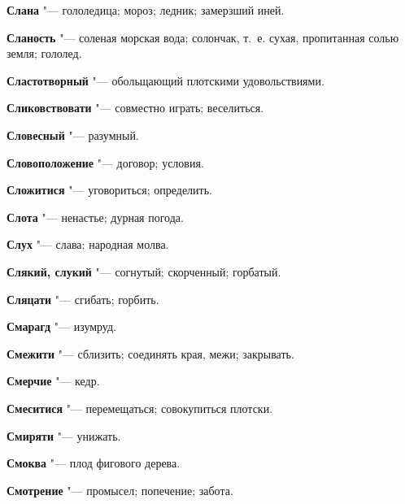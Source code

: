 \begin{mymulticols}{2}
\noindent\textbf{Слана} "--- гололедица; мороз; ледник; замерзший иней. 




\noindent\textbf{Сланость} "--- соленая морская вода; солончак, т.~е. сухая, пропитанная солью земля; гололед. 




\noindent\textbf{Сластотворный} "--- обольщающий плотскими удовольствиями. 




\noindent\textbf{Сликовствовати} "--- совместно играть; веселиться. 




\noindent\textbf{Словесный} "--- разумный. 




\noindent\textbf{Словоположение} "--- договор; условия. 




\noindent\textbf{Сложитися} "--- уговориться; определить. 




\noindent\textbf{Слота} "--- ненастье; дурная погода. 




\noindent\textbf{Слух} "--- слава; народная молва. 




\noindent\textbf{Слякий, слукий} "--- согнутый; скорченный; горбатый. 




\noindent\textbf{Сляцати} "--- сгибать; горбить. 




\noindent\textbf{Смарагд} "--- изумруд. 




\noindent\textbf{Смежити} "--- сблизить; соединять края, межи; закрывать. 




\noindent\textbf{Смерчие} "--- кедр. 




\noindent\textbf{Смеситися} "--- перемещаться; совокупиться плотски. 




\noindent\textbf{Смиряти} "--- унижать. 




\noindent\textbf{Смоква} "--- плод фигового дерева. 




\noindent\textbf{Смотрение} "--- промысел; попечение; забота. 





\end{mymulticols}
